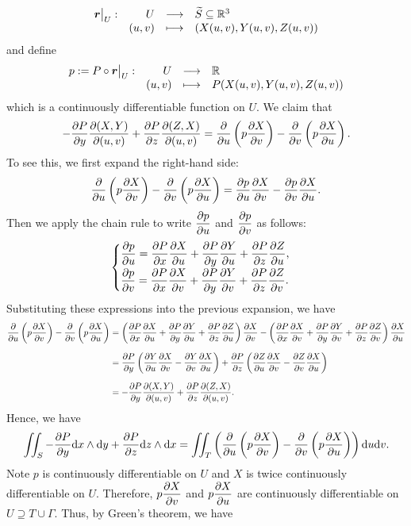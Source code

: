 \begin{proofenv}
$$\begin{array}{r r c l}
        \bm r\big|_U: & U & \longrightarrow & \widetilde S \subseteq \mathbb{R}^3\\
        & (u,v) & \longmapsto & (X(u,v), Y(u,v), Z(u,v))
    \end{array} $$
    and define
    $$ \begin{array}{r r c l}
        p:= P \circ \bm r\big|_U: & U & \longrightarrow & \mathbb{R}\\
        & (u,v) & \longmapsto & P(X(u,v), Y(u,v), Z(u,v))
    \end{array}
    $$
    which is a continuously differentiable function on $U$. We claim that
    $$ -\pdv{P}{y} \frac{\partial\!\left(X,Y\right)}{\partial\!\left(u,v\right)} + \pdv{P}{z} \frac{\partial\!\left(Z,X\right)}{\partial\!\left(u,v\right)} = \pdv{u} \left( p \pdv{X}{v} \right) - \pdv{v} \left( p \pdv{X}{u} \right).$$
    To see this, we first expand the right-hand side:
    $$ \pdv{u} \left( p \pdv{X}{v} \right) - \pdv{v} \left( p \pdv{X}{u} \right) = \pdv{p}{u} \pdv{X}{v} - \pdv{p}{v} \pdv{X}{u}.$$
    Then we apply the chain rule to write $\displaystyle \pdv{p}{u}$ and $\displaystyle \pdv{p}{v}$ as follows:
    $$ \begin{cases}
        \displaystyle \pdv{p}{u} = \pdv{P}{x}\pdv{X}{u} + \pdv{P}{y}\pdv{Y}{u} + \pdv{P}{z}\pdv{Z}{u},\\[6pt]
        \displaystyle \pdv{p}{v} = \pdv{P}{x}\pdv{X}{v} + \pdv{P}{y}\pdv{Y}{v} + \pdv{P}{z}\pdv{Z}{v}.
    \end{cases} $$
    Substituting these expressions into the previous expansion, we have
    $$ \begin{aligned}
        \pdv{u} \left( p \pdv{X}{v} \right) - \pdv{v} \left( p \pdv{X}{u} \right) &= \left( \pdv{P}{x}\pdv{X}{u} + \pdv{P}{y}\pdv{Y}{u} + \pdv{P}{z}\pdv{Z}{u} \right) \pdv{X}{v} - \left( \pdv{P}{x}\pdv{X}{v} + \pdv{P}{y}\pdv{Y}{v} + \pdv{P}{z}\pdv{Z}{v} \right) \pdv{X}{u}\\[6pt]
        &= \pdv{P}{y}\left( \pdv{Y}{u}\pdv{X}{v} - \pdv{Y}{v}\pdv{X}{u} \right) + \pdv{P}{z}\left( \pdv{Z}{u}\pdv{X}{v} - \pdv{Z}{v}\pdv{X}{u} \right)\\[6pt]
        &= -\pdv{P}{y} \frac{\partial\!\left(X,Y\right)}{\partial\!\left(u,v\right)} + \pdv{P}{z} \frac{\partial\!\left(Z,X\right)}{\partial\!\left(u,v\right)}.
    \end{aligned} $$
    Hence, we have
    $$ \iint_S -\pdv{P}{y} \dd x \wedge \dd y + \pdv{P}{z} \dd z \wedge \dd x = \iint_T \left( \pdv{u} \left( p \pdv{X}{v} \right) - \pdv{v} \left( p \pdv{X}{u} \right) \right) \dd u \dd v. $$
    Note $p$ is continuously differentiable on $U$ and $X$ is twice continuously differentiable on $U$. Therefore, $\displaystyle p \pdv{X}{v}$ and $\displaystyle p \pdv{X}{u}$ are continuously differentiable on $U\supseteq T \cup \Gamma$. Thus, by Green's theorem, we have

\end{proofenv}
